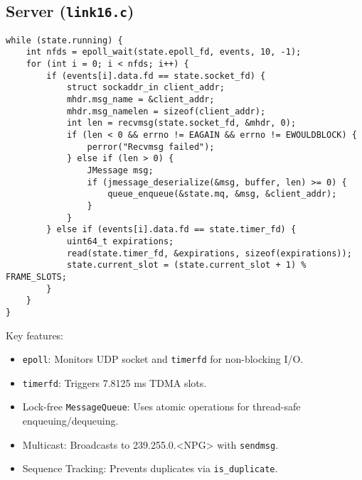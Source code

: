 \documentclass{article}
\begin{document}
\subsection{Server (\texttt{link16.c})}
\begin{lstlisting}[caption={Core Server Loop}, label={lst:server}]
while (state.running) {
    int nfds = epoll_wait(state.epoll_fd, events, 10, -1);
    for (int i = 0; i < nfds; i++) {
        if (events[i].data.fd == state.socket_fd) {
            struct sockaddr_in client_addr;
            mhdr.msg_name = &client_addr;
            mhdr.msg_namelen = sizeof(client_addr);
            int len = recvmsg(state.socket_fd, &mhdr, 0);
            if (len < 0 && errno != EAGAIN && errno != EWOULDBLOCK) {
                perror("Recvmsg failed");
            } else if (len > 0) {
                JMessage msg;
                if (jmessage_deserialize(&msg, buffer, len) >= 0) {
                    queue_enqueue(&state.mq, &msg, &client_addr);
                }
            }
        } else if (events[i].data.fd == state.timer_fd) {
            uint64_t expirations;
            read(state.timer_fd, &expirations, sizeof(expirations));
            state.current_slot = (state.current_slot + 1) % FRAME_SLOTS;
        }
    }
}
\end{lstlisting}
Key features:
\begin{itemize}
    \item \texttt{epoll}: Monitors UDP socket and \texttt{timerfd} for non-blocking I/O.
    \item \texttt{timerfd}: Triggers 7.8125 ms TDMA slots.
    \item Lock-free \texttt{MessageQueue}: Uses atomic operations for thread-safe enqueuing/dequeuing.
    \item Multicast: Broadcasts to 239.255.0.<NPG> with \texttt{sendmsg}.
    \item Sequence Tracking: Prevents duplicates via \texttt{is\_duplicate}.
\end{itemize}
\end{document}
